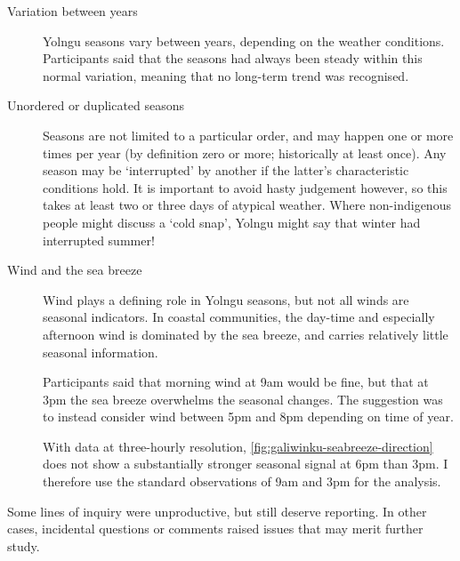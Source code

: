 \begin{description}
\item[Variation between years]
    Yolngu seasons vary between years, depending on the weather conditions.
    Participants said that the seasons had always been steady within this
    normal variation, meaning that no long-term trend was recognised.

\item[Unordered or duplicated seasons]
    Seasons are not limited to a particular order, and may happen one or more
    times per year (by definition zero or more; historically at least once).
    Any season may be `interrupted' by another if the latter's characteristic
    conditions hold.  It is important to avoid hasty judgement however, so this
    takes at least two or three days of atypical weather.
    Where non-indigenous people might discuss a `cold snap', Yolngu might
    say that winter had interrupted summer!

\item[Wind and the sea breeze]
    Wind plays a defining role in Yolngu seasons, but not all winds are
    seasonal indicators.  In coastal communities, the day-time and especially
    afternoon wind is dominated by the sea breeze, and carries relatively little
    seasonal information.

    Participants said that morning wind at 9am would be fine, but that at
    3pm the sea breeze overwhelms the seasonal changes.  The suggestion was
    to instead consider wind between 5pm and 8pm depending on time of year.

    With data at three-hourly resolution, \cref{fig:galiwinku-seabreeze-direction}
    does not show a substantially stronger seasonal signal at 6pm than 3pm.
    I therefore use the standard observations of 9am and 3pm for the analysis.
\end{description}

\noindent Some lines of inquiry were unproductive, but still deserve reporting.
In other cases, incidental questions or comments raised issues that may
merit further study.

